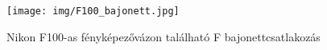 \begin{figure}[H]
	\centering
	\texttt{[image: img/F100\_bajonett.jpg]}
	\caption{Nikon F100-as fényképezővázon található F bajonettcsatlakozás}
	\label{fig:F_bajonett}
\end{figure}

